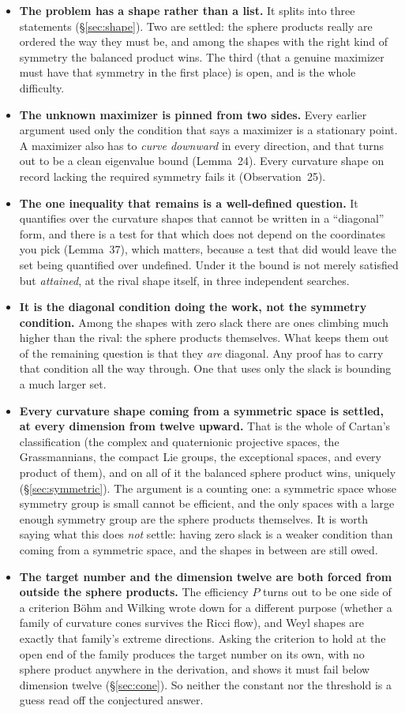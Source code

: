 \begin{itemize}[leftmargin=1.4em]
\item \textbf{The problem has a shape rather than a list.} It splits into three statements (\S\ref{sec:shape}). Two are settled: the sphere products really are ordered the way they must be, and among the shapes with the right kind of symmetry the balanced product wins. The third (that a genuine maximizer must have that symmetry in the first place) is open, and is the whole difficulty.
\item \textbf{The unknown maximizer is pinned from two sides.} Every earlier argument used only the condition that says a maximizer is a stationary point. A maximizer also has to \emph{curve downward} in every direction, and that turns out to be a clean eigenvalue bound (Lemma~24). Every curvature shape on record lacking the required symmetry fails it (Observation~25).
\item \textbf{The one inequality that remains is a well-defined question.} It quantifies over the curvature shapes that cannot be written in a ``diagonal'' form, and there is a test for that which does not depend on the coordinates you pick (Lemma~37), which matters, because a test that did would leave the set being quantified over undefined. Under it the bound is not merely satisfied but \emph{attained}, at the rival shape itself, in three independent searches.
\item \textbf{It is the diagonal condition doing the work, not the symmetry condition.} Among the shapes with zero slack there are ones climbing much higher than the rival: the sphere products themselves. What keeps them out of the remaining question is that they \emph{are} diagonal. Any proof has to carry that condition all the way through. One that uses only the slack is bounding a much larger set.
\item \textbf{Every curvature shape coming from a symmetric space is settled, at every dimension from twelve upward.} That is the whole of Cartan's classification (the complex and quaternionic projective spaces, the Grassmannians, the compact Lie groups, the exceptional spaces, and every product of them), and on all of it the balanced sphere product wins, uniquely (\S\ref{sec:symmetric}). The argument is a counting one: a symmetric space whose symmetry group is small cannot be efficient, and the only spaces with a large enough symmetry group are the sphere products themselves. It is worth saying what this does \emph{not} settle: having zero slack is a weaker condition than coming from a symmetric space, and the shapes in between are still owed.
\item \textbf{The target number and the dimension twelve are both forced from outside the sphere products.} The efficiency $P$ turns out to be one side of a criterion B\"ohm and Wilking wrote down for a different purpose (whether a family of curvature cones survives the Ricci flow), and Weyl shapes are exactly that family's extreme directions. Asking the criterion to hold at the open end of the family produces the target number on its own, with no sphere product anywhere in the derivation, and shows it must fail below dimension twelve (\S\ref{sec:cone}). So neither the constant nor the threshold is a guess read off the conjectured answer.

\end{itemize}
